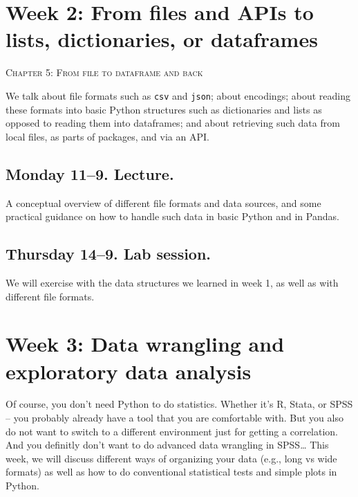 
\section*{Week 2: From files and APIs to lists, dictionaries, or dataframes}
\textsc{ Chapter 5: From file to dataframe and back}\\
\textsc{  \cite{freelon_computational_2018}}

We talk about file formats such as \texttt{csv} and \texttt{json}; about encodings; about reading these formats into basic Python structures such as dictionaries and lists as opposed to reading them into dataframes; and about retrieving such data from local files, as parts of packages, and via an API.


\subsection*{Monday 11--9. Lecture.}

A conceptual overview of different file formats and data sources, and some practical guidance on how to handle such data in basic Python and in Pandas.

\subsection*{Thursday 14--9. Lab session.}

We will exercise with the data structures we learned in week 1, as well as with different file formats.



\section*{Week 3: Data wrangling and exploratory data analysis}

Of course, you don't need Python to do statistics. Whether it's R, Stata, or SPSS -- you probably already have a tool that you are comfortable with. But you also do not want to switch to a different environment just for getting a correlation. And you definitly don't want to do advanced data wrangling in SPSS\ldots
This week, we will discuss different ways of organizing your data (e.g., long vs wide formats) as well as how to do conventional statistical tests and simple plots in Python.

